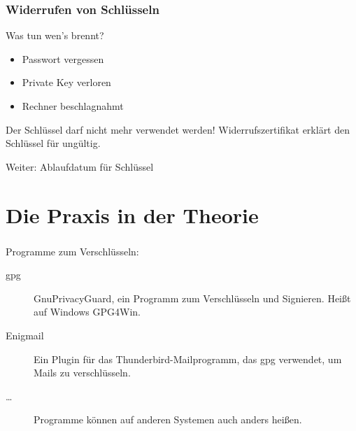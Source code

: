 \documentclass[compress]{beamer}
\begin{document}
\begin{frame}
    \frametitle{Widerrufen von Schlüsseln}
    Was tun wen's brennt?
    \begin{itemize}
        \item Passwort vergessen
        \item Private Key verloren
        \item Rechner beschlagnahmt
    \end{itemize}
    Der Schlüssel darf nicht mehr verwendet werden!
    \alert{Widerrufszertifikat} erklärt den Schlüssel für ungültig.

    Weiter: Ablaufdatum für Schlüssel
\end{frame}

\section{Die Praxis in der Theorie}
\label{sec-1-1-5}

\begin{frame}
  \frametitle{\insertsection}
  Programme zum Verschlüsseln:

  \begin{description}
  \item[gpg] \alert{G}nu\alert{P}rivacy\alert{G}uard, ein Programm zum
    Verschlüsseln und Signieren.  Heißt auf Windows \alert{GPG4Win}.
  \item[Enigmail] Ein Plugin für das Thunderbird-Mailprogramm, das gpg
    verwendet, um Mails zu verschlüsseln.
  \item[\ldots] Programme können auf anderen Systemen auch anders
    heißen.
  \end{description}

\end{frame}
\end{document}
